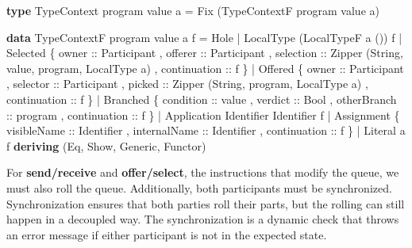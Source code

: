 \documentclass[runningheads]{llncs}
\newenvironment{Shaded}{}{}
\newcommand{\KeywordTok}[1]{\textcolor[rgb]{0.00,0.44,0.13}{\textbf{#1}}}
\newcommand{\DataTypeTok}[1]{\textcolor[rgb]{0.56,0.13,0.00}{#1}}
\newcommand{\OtherTok}[1]{\textcolor[rgb]{0.00,0.44,0.13}{#1}}
\newcommand{\FunctionTok}[1]{\textcolor[rgb]{0.02,0.16,0.49}{#1}}
\newcommand{\NormalTok}[1]{#1}
\begin{document}
\begin{Shaded}
\begin{Highlighting}[]
\KeywordTok{type} \DataTypeTok{TypeContext}\NormalTok{ program value a }\FunctionTok{=} \DataTypeTok{Fix}\NormalTok{ (}\DataTypeTok{TypeContextF}\NormalTok{ program value a)}

\KeywordTok{data} \DataTypeTok{TypeContextF}\NormalTok{ program value a f }
    \FunctionTok{=} \DataTypeTok{Hole} 
    \FunctionTok{|} \DataTypeTok{LocalType}\NormalTok{ (}\DataTypeTok{LocalTypeF}\NormalTok{ a ()) f }
    \FunctionTok{|} \DataTypeTok{Selected} 
\NormalTok{        \{}\OtherTok{ owner ::} \DataTypeTok{Participant}
\NormalTok{        ,}\OtherTok{ offerer ::} \DataTypeTok{Participant} 
\NormalTok{        ,}\OtherTok{ selection ::} \DataTypeTok{Zipper}\NormalTok{ (}\DataTypeTok{String}\NormalTok{, value, program, }\DataTypeTok{LocalType}\NormalTok{ a)}
\NormalTok{        ,}\OtherTok{ continuation ::}\NormalTok{ f }
\NormalTok{        \}}
    \FunctionTok{|} \DataTypeTok{Offered} 
\NormalTok{        \{}\OtherTok{ owner ::} \DataTypeTok{Participant}
\NormalTok{        ,}\OtherTok{ selector ::} \DataTypeTok{Participant} 
\NormalTok{        ,}\OtherTok{ picked ::} \DataTypeTok{Zipper}\NormalTok{ (}\DataTypeTok{String}\NormalTok{, program, }\DataTypeTok{LocalType}\NormalTok{ a)}
\NormalTok{        ,}\OtherTok{ continuation ::}\NormalTok{ f }
\NormalTok{        \}}
    \FunctionTok{|} \DataTypeTok{Branched} 
\NormalTok{        \{}\OtherTok{ condition ::}\NormalTok{ value}
\NormalTok{        ,}\OtherTok{ verdict ::} \DataTypeTok{Bool}
\NormalTok{        ,}\OtherTok{ otherBranch ::}\NormalTok{ program}
\NormalTok{        ,}\OtherTok{ continuation ::}\NormalTok{ f }
\NormalTok{        \}}
    \FunctionTok{|} \DataTypeTok{Application} \DataTypeTok{Identifier} \DataTypeTok{Identifier}\NormalTok{ f }
    \FunctionTok{|} \DataTypeTok{Assignment} 
\NormalTok{        \{}\OtherTok{ visibleName ::} \DataTypeTok{Identifier}
\NormalTok{        ,}\OtherTok{ internalName ::} \DataTypeTok{Identifier}
\NormalTok{        ,}\OtherTok{ continuation ::}\NormalTok{ f }
\NormalTok{        \}}
    \FunctionTok{|} \DataTypeTok{Literal}\NormalTok{ a f}
    \KeywordTok{deriving}\NormalTok{ (}\DataTypeTok{Eq}\NormalTok{, }\DataTypeTok{Show}\NormalTok{, }\DataTypeTok{Generic}\NormalTok{, }\DataTypeTok{Functor}\NormalTok{)}
\end{Highlighting}
\end{Shaded}

For \textbf{send/receive} and \textbf{offer/select}, the instructions
that modify the queue, we must also roll the queue. Additionally, both
participants must be synchronized. Synchronization ensures that both
parties roll their parts, but the rolling can still happen in a
decoupled way. The synchronization is a dynamic check that throws an
error message if either participant is not in the expected state.
\end{document}
